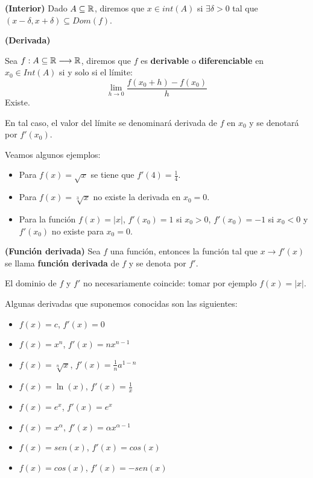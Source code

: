\begin{definicion}
	\textbf{(Interior)} 
	Dado $A \subseteq \mathbb{R}$, diremos que $x \in int (A)$ si $\exists \delta > 0$ tal que $(x - \delta , x + \delta ) \subseteq Dom(f)$. 
\end{definicion}	

\begin{definicion}
	\textbf{(Derivada)}
	
	Sea $f: A \subseteq \mathbb{R} \longrightarrow \mathbb{R}$, diremos que $f$ es \textbf{derivable} o \textbf{diferenciable} en $x_0 \in Int(A)$ si y solo si el límite: 
	$$ \lim_{h\rightarrow 0} \dfrac{f(x_0 + h) - f(x_0)}{h} $$ 
	Existe. 
	
	En tal caso, el valor del límite se denominará derivada de $f$ en $x_0$ y se denotará por $f'(x_0)$. 
\end{definicion}

\begin{ejemplo}
	Veamos algunos ejemplos: 
	\begin{itemize}
		\item Para $f(x) = \sqrt{x}$ se tiene que $f'(4) = \frac{1}{4}$. 
		\item Para $f(x) = \sqrt[3]{x}$ no existe la derivada en $x_0 =0$. 
		\item Para la función $f(x) = |x|$, $f'(x_0) = 1$ si $x_0 > 0$, $f'(x_0) = -1$ si $x_0 < 0$ y $f'(x_0)$ no existe para $x_0 = 0$. 
	\end{itemize}
\end{ejemplo}

\begin{definicion}
	\textbf{(Función derivada)}
	Sea $f$ una función, entonces la función tal que $x \rightarrow f'(x)$ se llama \textbf{función derivada} de $f$ y se denota por $f'$. 
\end{definicion}

\begin{nota}
	El dominio de $f$ y $f'$ no necesariamente coincide: tomar por ejemplo $f(x) = | x |$. 
\end{nota}
	
	
\begin{proposicion}
	Algunas derivadas que suponemos conocidas son las siguientes: 
	\begin{itemize}
		\item $f(x) = c$, $f'(x) = 0$
		\item $f(x) = x^n$, $f'(x) = n x^{n-1}$
		\item $f(x) = \sqrt[n]{x}$, $f'(x) = \frac{1}{n} a^{1-n}$
		\item $f(x) = \ln(x)$, $f'(x) = \frac{1}{x}$
		\item $f(x) = e^x$, $f'(x) = e^x$
		\item $f(x) = x^\alpha$, $f'(x) = \alpha x^{\alpha -1}$
		\item $f(x) = sen(x)$, $f'(x) = cos(x)$
		\item $f(x) = cos(x)$, $f'(x) = - sen(x)$
	\end{itemize}
\end{proposicion}



